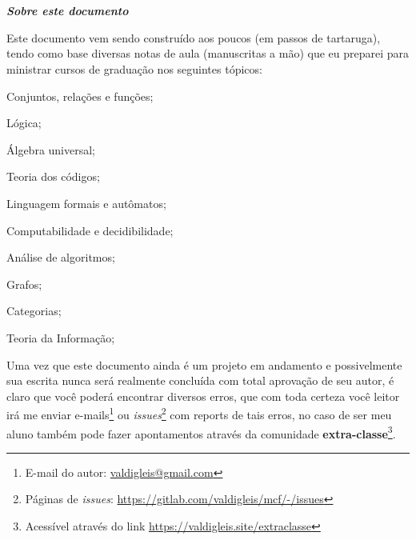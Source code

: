 \begingroup

\newpage \thispagestyle{empty} \
\newpage

\thispagestyle{empty}
\begin{center}
	{\normalfont\fontsize{20}{20}\sffamily\selectfont {\color{NordAurora5}\faLightbulb} \\ \textbf{\textit{Sobre este documento}}}\par
\end{center}


Este documento vem sendo construído aos poucos ({\color{NordAurora1}em passos de tartaruga}), tendo como base diversas notas de aula (manuscritas a mão) que eu preparei  para ministrar cursos de graduação nos seguintes tópicos:


\begin{multicols}{2}
	\begin{fieldsList}
		\item Conjuntos, relações e funções;
		\item Lógica;
		\item Álgebra universal;
		\item Teoria dos códigos;
		\item Linguagem formais e autômatos;
		\item Computabilidade e decidibilidade;
		\item Análise de algoritmos;
		\item Grafos;
		\item Categorias;
		\item Teoria da Informação;
	\end{fieldsList}
\end{multicols}	

Uma vez que este documento ainda é um projeto em andamento e possivelmente sua escrita nunca será realmente concluída com total aprovação de seu autor, é claro que você poderá encontrar diversos erros, que com toda certeza você leitor irá me enviar e-mails\footnote{E-mail do autor: \url{valdigleis@gmail.com}} ou \textit{issues}\footnote{Páginas de \textit{issues}: \url{https://gitlab.com/valdigleis/mcf/-/issues}} com reports de tais erros, no caso de ser meu aluno também pode fazer apontamentos através da comunidade \textbf{extra-classe}\footnote{Acessível através do link \url{https://valdigleis.site/extraclasse}}.

